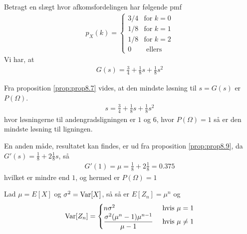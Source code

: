 \begin{exmp} %
    Betragt en slægt hvor afkomsfordelingen har følgende pmf
    \begin{align*}
        p_X(k) = \begin{cases}
                    3/4  & \text{for } k = 0 \\
                    1/8  & \text{for } k = 1 \\
                    1/8  & \text{for } k = 2 \\
                    0 & \text{ ellers}
                \end{cases}
    \end{align*}
Vi har, at 
\begin{align*}
    G(s)=\frac{3}{4}+\frac{1}{8}s+\frac{1}{8}s^2
\end{align*}

Fra proposition \ref{prop:prop8.7} vides, at den mindste løsning til $s=G(s)$ er $P(\Omega)$.
\begin{align*}
    s=\frac{3}{4}+\frac{1}{8}s+\frac{1}{8}s^2
\end{align*}
hvor løsningerne til andengradsligningen er $1$ og $6$, hvor $P(\Omega)=1$ så er den mindste løsning til ligningen. 

En anden måde, resultatet kan findes, er ud fra proposition \ref{prop:prop8.9}, da $G'(s)=\frac{1}{8}+2\frac{1}{8}s$, så 
\begin{align*}
    G'(1)=\mu=\frac{1}{8}+2\frac{1}{8}=0.375
\end{align*}
hvilket er mindre end $1$, og hermed er $P(\Omega)=1$
\end{exmp}


\begin{prop} %
    Lad $\mu=E[X]$ og $\sigma^2=\textnormal{Var}[X]$, så så er $E[Z_n]=\mu^n$ og
    \begin{equation*}
        \textnormal{Var}[Z_n] = \begin{cases} 
        n\sigma^2 & \text{ hvis } \mu =1\\
        \dfrac{\sigma^2(\mu^n-1)\mu^{n-1}}{\mu-1} & \text{ hvis } \mu \neq 1
        \end{cases}
    \end{equation*} 
\end{prop}

